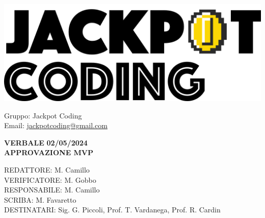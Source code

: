 \documentclass[5pt]{article}
\begin{document}
\begin{minipage}[t]{0.50\textwidth}
    \begin{flushleft}
        \hspace{10pt}
        \includegraphics[scale=0.65]{jackpot-logo.png} 
    \end{flushleft}
\end{minipage}
\hspace{-60pt} %
\begin{flushright}
    \begin{minipage}[t]{0.50\textwidth}
        \begin{flushright}
            Gruppo: {\Large Jackpot Coding}\\
            Email: \href{mailto:jackpotcoding@gmail.com}{jackpotcoding@gmail.com}
        \end{flushright}
    \end{minipage}
\end{flushright}

\vspace{20pt}

\begin{center}
    \textbf{\large VERBALE }
    \textbf{\large 02/05/2024} \\
    \textbf{\LARGE  APPROVAZIONE MVP}
\end{center}

\vspace{13pt}

\begin{flushleft}
    \begin{spacing}{1.5}
        REDATTORE: M. Camillo\\ 
        VERIFICATORE: M. Gobbo\\ 
        RESPONSABILE: M. Camillo\\ 
        \vspace{7pt}
        SCRIBA: M. Favaretto\\ 
        \vspace{7pt}
        DESTINATARI: Sig. G. Piccoli, Prof. T. Vardanega, Prof. R. Cardin\\ 
    \end{spacing}
\end{flushleft}
\end{document}
